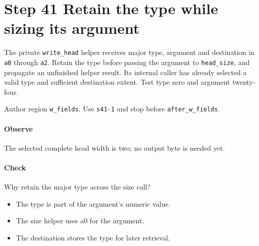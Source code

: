 \section{Step 41 Retain the type while sizing its argument}\label{cbor-s41}
The private \texttt{write\_head} helper receives major type, argument and destination in \texttt{a0} through \texttt{a2}. Retain the type before passing the argument to \texttt{head\_size}, and propagate an unfinished helper result. Its internal caller has already selected a valid type and sufficient destination extent. Test type zero and argument twenty-four.

Author region \texttt{w\_fields}. Use \texttt{s41-1} and stop before \texttt{after\_w\_fields}. 

\paragraph{Observe} The selected complete head width is two; no output byte is needed yet.

\paragraph{Check} Why retain the major type across the size call?
\begin{itemize}
\item[A.] The type is part of the argument's numeric value.
\item[B.] The size helper uses a0 for the argument.
\item[C.] The destination stores the type for later retrieval.
\end{itemize}
